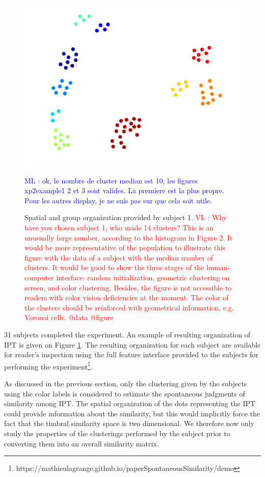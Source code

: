\documentclass{article}
\makeatletter
\newcommand*{\eg}{e.g.\@\xspace}
\newcommand{\ipt}{IPT\xspace}
\newcommand{\ml}[1]{\textcolor{blue}{ML : #1}}
\newcommand{\vl}[1]{\textcolor{red}{VL : #1}}
\makeatother
\begin{document}
\begin{figure}
\center
\includegraphics[width = \textwidth]{figures/xp2example1.png}
\caption{Spatial and group organization provided by subject 1.
\vl{
Why have you chosen subject 1, who made 14 clusters?
This is an unusually large number, according to the
histogram in Figure 2.
It would be more representative of the population to illustrate this figure
with the data of a subject with the median number of clusters.
It would be good to show the three stages of the human-computer interface:
random initialization,
geometric clustering on screen,
and color clustering.
Besides, the figure is not accessible to readers with
color vision deficiencies at the moment.
The color of the clusters should be reinforced with
geometrical information, \eg{} Voronoi cells.
@data @figure}}
\ml{ok, le nombre de cluster median est 10, les figures xp2example1 2 et 3 sont valides. La premiere est la plus propre. Pour les autres display, je ne suis pas sur que cela soit utile.}
\label{fig:xp2display}
\end{figure}

31 subjects completed the experiment. An example of resulting organization of \ipt is given on Figure \ref{fig:xp2display}. The resulting organization for each subject are available for reader's inspection using the full feature interface provided to the subjects for performing the experiment\footnote{https://mathieulagrange.github.io/paperSpontaneousSimilarity/demo}.

As discussed in the previous section, only the clustering given by the subjects using the color labels is considered to estimate the spontaneous judgments of similarity among \ipt. The spatial organization of the dots representing the \ipt could provide information about the similarity, but this would implicitly force the fact that the timbral similarity space is two dimensional. We therefore now only study the properties of the clusterings performed by the subject prior to converting them into an overall similarity matrix.
\end{document}
